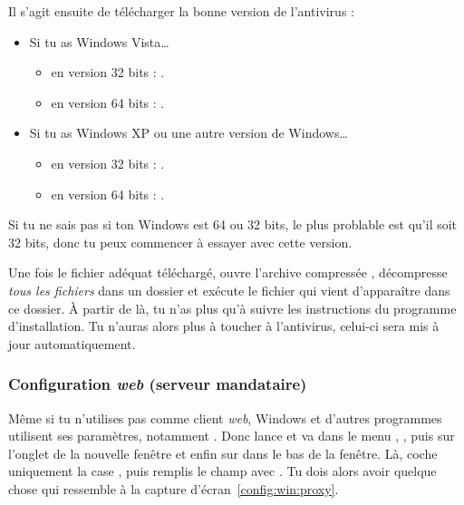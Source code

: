 Il s'agit ensuite de télécharger la bonne version de l'antivirus :
\begin{itemize}

\item Si tu as Windows Vista\dots
\begin{itemize}
\item en version 32 bits : .
\item en version 64 bits : .
\end{itemize}

\item Si tu as Windows XP ou une autre version de Windows\dots
\begin{itemize}
\item en version 32 bits : .
\item en version 64 bits : .
\end{itemize}
\end{itemize}

Si tu ne sais pas si ton Windows est 64 ou 32 bits, le plus problable est qu'il
soit 32 bits, donc tu peux commencer à essayer avec cette version.

Une fois le fichier adéquat téléchargé, ouvre l'archive compressée , décompresse \emph{tous les fichiers} dans un dossier et exécute le fichier  qui vient d'apparaître dans ce dossier. \`A partir de là, tu n'as plus qu'à suivre les instructions du
programme d'installation. Tu n'auras alors plus à toucher à l'antivirus, celui-ci sera mis à jour automatiquement.%

\subsubsection{Configuration \emph{web} (serveur mandataire)}


Même si tu n'utilises pas  comme client \emph{web}, Windows et d'autres programmes
utilisent ses paramètres, notamment . Donc lance  et va
dans le menu , , puis sur l'onglet  de la
nouvelle fenêtre et enfin sur  dans le bas de la fenêtre. Là, coche
uniquement la case , puis remplis le champ
 avec . Tu dois alors avoir quelque chose qui
ressemble à la capture d'écran~\ref{config:win:proxy}.

